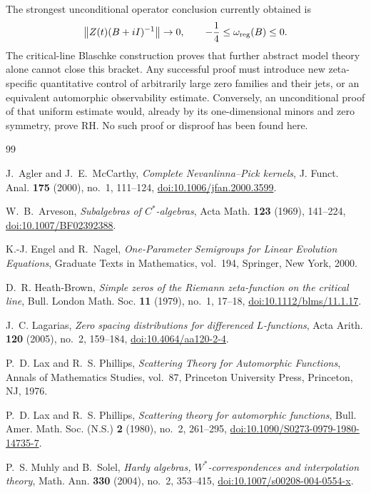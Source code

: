 \documentclass[11pt]{amsart}
\theoremstyle{definition}
\theoremstyle{remark}
\newcommand{\norm}[1]{\left\lVert #1\right\rVert}
\begin{document}
The strongest unconditional operator conclusion currently obtained is
\[
 \norm{Z(t)(B+iI)^{-1}}\to0,
 \qquad -\frac14\leq\omega_{\rm reg}(B)\leq0.
\]
The critical-line Blaschke construction proves that further abstract model
theory alone cannot close this bracket.  Any successful proof must introduce
new zeta-specific quantitative control of arbitrarily large zero families and
their jets, or an equivalent automorphic observability estimate.  Conversely,
an unconditional proof of that uniform estimate would, already by its
one-dimensional minors and zero symmetry, prove RH.  No such proof or
disproof has been found here.

\begin{thebibliography}{99}

J.~Agler and J.~E.~McCarthy,
\emph{Complete Nevanlinna--Pick kernels},
J. Funct. Anal. \textbf{175} (2000), no.~1, 111--124,
\href{https://doi.org/10.1006/jfan.2000.3599}{doi:10.1006/jfan.2000.3599}.

W.~B.~Arveson,
\emph{Subalgebras of $C^*$-algebras},
Acta Math. \textbf{123} (1969), 141--224,
\href{https://doi.org/10.1007/BF02392388}{doi:10.1007/BF02392388}.

K.-J. Engel and R.~Nagel,
\emph{One-Parameter Semigroups for Linear Evolution Equations},
Graduate Texts in Mathematics, vol.~194, Springer, New York, 2000.

D.~R. Heath-Brown,
\emph{Simple zeros of the Riemann zeta-function on the critical line},
Bull. London Math. Soc. \textbf{11} (1979), no.~1, 17--18,
\href{https://doi.org/10.1112/blms/11.1.17}{doi:10.1112/blms/11.1.17}.

J.~C. Lagarias,
\emph{Zero spacing distributions for differenced $L$-functions},
Acta Arith. \textbf{120} (2005), no.~2, 159--184,
\href{https://doi.org/10.4064/aa120-2-4}{doi:10.4064/aa120-2-4}.

P.~D. Lax and R.~S. Phillips,
\emph{Scattering Theory for Automorphic Functions},
Annals of Mathematics Studies, vol.~87,
Princeton University Press, Princeton, NJ, 1976.

P.~D. Lax and R.~S. Phillips,
\emph{Scattering theory for automorphic functions},
Bull. Amer. Math. Soc. (N.S.) \textbf{2} (1980), no.~2, 261--295,
\href{https://doi.org/10.1090/S0273-0979-1980-14735-7}
{doi:10.1090/S0273-0979-1980-14735-7}.

P.~S. Muhly and B.~Solel,
\emph{Hardy algebras, $W^*$-correspondences and interpolation theory},
Math. Ann. \textbf{330} (2004), no.~2, 353--415,
\href{https://doi.org/10.1007/s00208-004-0554-x}
{doi:10.1007/s00208-004-0554-x}.


\end{thebibliography}
\end{document}
